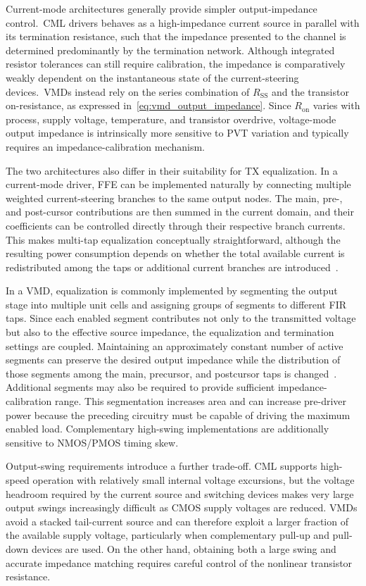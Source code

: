 Current-mode architectures generally provide simpler output-impedance control.~\ac{CML} drivers behaves as a high-impedance current source in parallel with its termination resistance, such that the impedance presented to the channel is determined predominantly by the termination network. Although integrated resistor tolerances can still require calibration, the impedance is comparatively weakly dependent on the instantaneous state of the current-steering devices.~\acsp{VMD} instead rely on the series combination of $R_{\mathrm{SS}}$ and the transistor on-resistance, as expressed in~\eqref{eq:vmd_output_impedance}. Since $R_{\mathrm{on}}$ varies with process, supply voltage, temperature, and transistor overdrive, voltage-mode output impedance is intrinsically more sensitive to \ac{PVT} variation and typically requires an impedance-calibration mechanism.

The two architectures also differ in their suitability for \ac{TX} equalization. In a current-mode driver, \ac{FFE} can be implemented naturally by connecting multiple weighted current-steering branches to the same output nodes. The main, pre-, and post-cursor contributions are then summed in the current domain, and their coefficients can be controlled directly through their respective branch currents. This makes multi-tap equalization conceptually straightforward, although the resulting power consumption depends on whether the total available current is redistributed among the taps or additional current branches are introduced~\cite{sredojevic_jssc_2011}.

In a \ac{VMD}, equalization is commonly implemented by segmenting the output stage into multiple unit cells and assigning groups of segments to different \ac{FIR} taps. Since each enabled segment contributes not only to the transmitted voltage but also to the effective source impedance, the equalization and termination settings are coupled. Maintaining an approximately constant number of active segments can preserve the desired output impedance while the distribution of those segments among the main, precursor, and postcursor taps is changed~\cite{xiong_vmd_2020}. Additional segments may also be required to provide sufficient impedance-calibration range. This segmentation increases area and can increase pre-driver power because the preceding circuitry must be capable of driving the maximum enabled load. Complementary high-swing implementations are additionally sensitive to NMOS/PMOS timing skew.

Output-swing requirements introduce a further trade-off. \ac{CML} supports high-speed operation with relatively small internal voltage excursions, but the voltage headroom required by the current source and switching devices makes very large output swings increasingly difficult as CMOS supply voltages are reduced. \acsp{VMD} avoid a stacked tail-current source and can therefore exploit a larger fraction of the available supply voltage, particularly when complementary pull-up and pull-down devices are used. On the other hand, obtaining both a large swing and accurate impedance matching requires careful control of the nonlinear transistor resistance.

